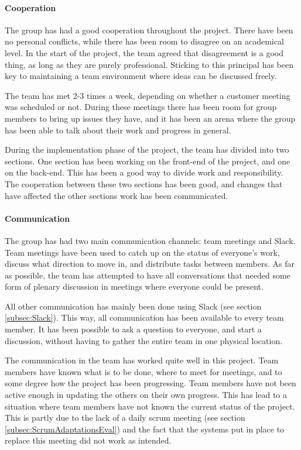 \documentclass[11pt,a4paper,titlepage,oneside]{report}
\begin{document}
\paragraph{Cooperation}
The group has had a good cooperation throughout the project. There have been no personal conflicts, while there has been room to disagree on an academical level. In the start of the project, the team agreed that disagreement is a good thing, as long as they are purely professional. Sticking to this principal has been key to maintaining a team environment where ideas can be discussed freely. 

The team has met 2-3 times a week, depending on whether a customer meeting was scheduled or not. During these meetings there has been room for group members to bring up issues they have, and it has been an arena where the group has been able to talk about their work and progress in general. 

During the implementation phase of the project, the team has divided into two sections. One section has been working on the \gls{front-end} of the project, and one on the \gls{back-end}. This has been a good way to divide work and responsibility. The cooperation between these two sections has been good, and changes that have affected the other sections work has been communicated. 

\paragraph{Communication}
The group has had two main communication channels: team meetings and Slack. Team meetings have been used to catch up on the status of everyone's work, discuss what direction to move in, and distribute tasks between members. As far as possible, the team has attempted to have all conversations that needed some form of plenary discussion in meetings where everyone could be present.

All other communication has mainly been done using Slack (see section \ref{subsec:Slack}). This way, all communication has been available to every team member. It has been possible to ask a question to everyone, and start a discussion, without having to gather the entire team in one physical location.

The communication in the team has worked quite well in this project. Team members have known what is to be done, where to meet for meetings, and to some degree how the project has been progressing. Team members have not been active enough in updating the others on their own progress. This has lead to a situation where team members have not known the current status of the project. This is partly due to the lack of a daily scrum meeting (see section \ref{subsec:ScrumAdaptationsEval}) and the fact that the systems put in place to replace this meeting did not work as intended.
\end{document}
